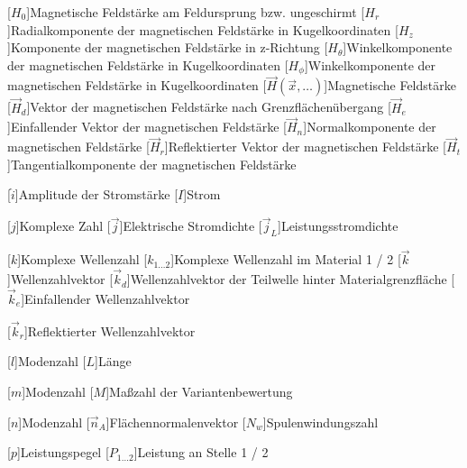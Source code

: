 \begin{acronym}[Platzhalterwort]
[$H_0$]{\acrounit{\ampere\per\meter}Magnetische Feldstärke am Feldursprung bzw. ungeschirmt}
[$H_r$]{\acrounit{\ampere\per\meter}Radialkomponente der magnetischen Feldstärke in Kugelkoordinaten}
[$H_z$]{\acrounit{\ampere\per\meter}Komponente der magnetischen Feldstärke in z-Richtung}
[$H_{\theta}$]{\acrounit{\ampere\per\meter}Winkelkomponente der magnetischen Feldstärke in Kugelkoordinaten}
[$H_{\phi}$]{\acrounit{\ampere\per\meter}Winkelkomponente der magnetischen Feldstärke in Kugelkoordinaten}
[$\vec H(\vec x, \ldots)$]{\acrounit{\ampere\per\meter}Magnetische Feldstärke}
[$\vec H_d$]{\acrounit{\ampere\per\meter}Vektor der magnetischen Feldstärke nach Grenzflächenübergang}
[$\vec H_e$]{\acrounit{\ampere\per\meter}Einfallender Vektor der magnetischen Feldstärke}
[$\vec H_n$]{\acrounit{\ampere\per\meter}Normalkomponente der magnetischen Feldstärke}
[$\vec H_r$]{\acrounit{\ampere\per\meter}Reflektierter Vektor der magnetischen Feldstärke}
[$\vec H_t$]{\acrounit{\ampere\per\meter}Tangentialkomponente der magnetischen Feldstärke}


[$\hat i$]{\acrounit{\ampere}Amplitude der Stromstärke}
[$I$]{\acrounit{\ampere}Strom}

[$j$]{\acrounit{-}Komplexe Zahl}
[$\vec j$]{\acrounit{\ampere\per\square\meter}Elektrische Stromdichte}
[$\vec j_L$]{\acrounit{\ampere\per\square\meter}Leistungsstromdichte}

[$k$]{\acrounit{-}Komplexe Wellenzahl}
[$k_{1\ldots2}$]{\acrounit{-}Komplexe Wellenzahl im Material 1 / 2}
[$\vec k$]{\acrounit{-}Wellenzahlvektor}
[$\vec k_d$]{\acrounit{-}Wellenzahlvektor der Teilwelle hinter Materialgrenzfläche}
[$\vec k_e$]{\acrounit{-}Einfallender Wellenzahlvektor}

[$\vec k_r$]{\acrounit{-}Reflektierter Wellenzahlvektor}

[$l$]{Modenzahl}
[$L$]{\acrounit{\meter}Länge}

[$m$]{Modenzahl}
[$M$]{\acrounit{-}Maßzahl der Variantenbewertung}

[$n$]{Modenzahl}
[$\vec n_A$]{Flächennormalenvektor}
[$N_w$]{Spulenwindungszahl}

[$p$]{\acrounit{\Dezibel}Leistungspegel}
[$P_{1\ldots2}$]{\acrounit{\watt}Leistung an Stelle 1 / 2}


\end{acronym}
